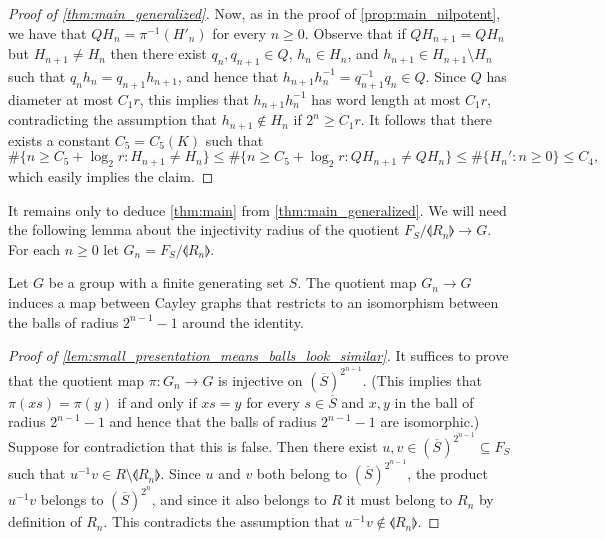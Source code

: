 \begin{proof}[Proof of \cref{thm:main_generalized}]
\medskip

Now, as in the proof of \cref{prop:main_nilpotent}, we have that $QH_n = \pi^{-1}(H'_n)$ for every $n\geq 0$.
Observe that if $QH_{n+1} = QH_n$ but $H_{n+1}\neq H_n$ then there exist $q_n,q_{n+1}\in Q$, $h_n \in H_n$, and $h_{n+1}\in H_{n+1}\setminus  H_n$ such that $q_nh_n=q_{n+1} h_{n+1}$, and hence that $h_{n+1}h_n^{-1}=q_{n+1}^{-1}q_n \in Q$. Since $Q$ has diameter at most $C_1r$, this implies that $h_{n+1}h_n^{-1}$ has word length at most $C_1r$, contradicting the assumption that $h_{n+1}\notin H_n$ if $2^n \geq C_1 r$. 
It follows that there exists a constant $C_5=C_5(K)$ such that
\[
\#\{ n \geq C_5 + \log_2 r:H_{n+1} \neq H_n \} \leq \#\{ n \geq C_5 + \log_2 r: Q H_{n+1} \neq QH_n \} \leq \#\{ H_n' : n \geq 0 \} \leq C_4,
\]
which easily implies the claim.
\end{proof}

It remains only to deduce \cref{thm:main} from \cref{thm:main_generalized}. We will need the following lemma about the injectivity radius of the quotient $F_S / \llangle R_n\rrangle \to G$. For each $n\geq 0$ let $G_n = F_S / \llangle R_n \rrangle$.

\begin{lem} \label{lem:small_presentation_means_balls_look_similar}
      Let $G$ be a group with a finite generating set $S$.
       The quotient map $G_{n}\to G$ induces a map between Cayley graphs that restricts to an isomorphism between the balls of radius $2^{n-1}-1$ around the identity.
\end{lem}


\begin{proof}[Proof of \cref{lem:small_presentation_means_balls_look_similar}]
%
      It suffices to prove that the quotient 
      map $\pi:G_{n} \to G$ is injective on $(\overline{S})^{2^{n-1}}$. (This implies that $\pi(x s)=\pi(y)$ if and only if $xs=y$ for every $s\in \overline{S}$ and $x,y$ in the ball of radius $2^{n-1}-1$ and hence that the balls of radius $2^{n-1}-1$ are isomorphic.)
      Suppose for contradiction that this is false. Then there exist $u,v \in (\overline{S})^{2^{n-1}} \subseteq F_S$ such that
%
      $u^{-1} v \in R \setminus \llangle R_{n} \rrangle$.
%
Since $u$ and $v$ both belong to $(\overline{S})^{2^{n-1}}$, the product   $u^{-1}v$ belongs to $(\overline{S})^{2^{n}}$, and since it also belongs to $R$ it must belong to $R_{n}$ by definition of $R_{n}$. This contradicts the assumption that $u^{-1}v \notin \llangle R_{n} \rrangle$.
\end{proof}

